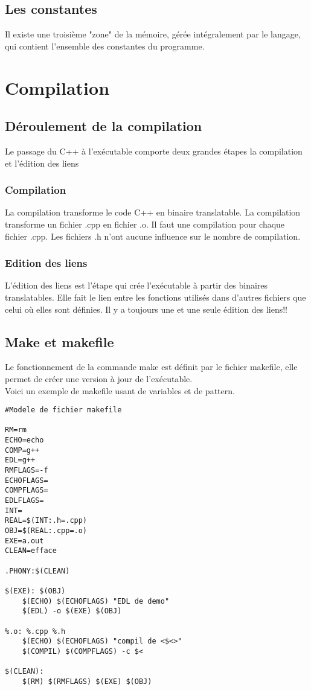 \documentclass[10pt,a4paper,twoside]{article}
\begin{document}
\subsection{Les constantes}
Il existe une troisième "zone" de la mémoire, gérée intégralement par le langage, qui contient l'ensemble des constantes du programme.

\section{Compilation}
\subsection{Déroulement de la compilation}
Le passage du C++ à l'exécutable comporte deux grandes étapes la compilation et l'édition des liens

\subsubsection{Compilation}
La compilation transforme le code C++ en binaire translatable. La compilation transforme un fichier .cpp en fichier .o. Il faut une compilation pour chaque fichier .cpp. Les fichiers .h n'ont aucune influence sur le nombre de compilation.

\subsubsection{Edition des liens}
L'édition des liens est l'étape qui crée l'exécutable à partir des binaires translatables. Elle fait le lien entre les fonctions utilisés dans d'autres fichiers que celui où elles sont définies. Il y a toujours une et une seule édition des liens!!

\subsection{Make et makefile}
Le fonctionnement de la commande make est définit par le fichier makefile, elle permet de créer une version à jour de l'exécutable.\\
Voici un exemple de makefile usant de variables et de pattern.

\begin{verbatim}
#Modele de fichier makefile

RM=rm
ECHO=echo
COMP=g++
EDL=g++
RMFLAGS=-f
ECHOFLAGS=
COMPFLAGS=
EDLFLAGS=
INT=
REAL=$(INT:.h=.cpp)
OBJ=$(REAL:.cpp=.o)
EXE=a.out
CLEAN=efface

.PHONY:$(CLEAN)

$(EXE): $(OBJ)
	$(ECHO) $(ECHOFLAGS) "EDL de demo"
	$(EDL) -o $(EXE) $(OBJ)

%.o: %.cpp %.h
	$(ECHO) $(ECHOFLAGS) "compil de <$<>"
	$(COMPIL) $(COMPFLAGS) -c $<

$(CLEAN):
	$(RM) $(RMFLAGS) $(EXE) $(OBJ)
\end{verbatim}
\end{document}
